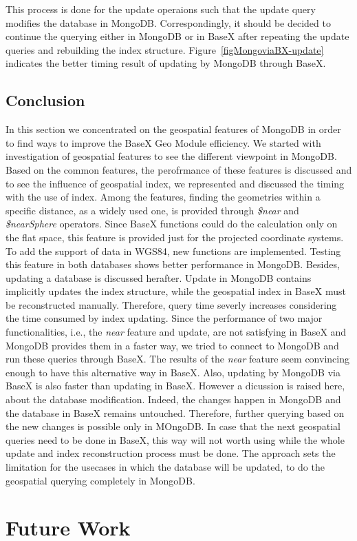 \documentclass[a4paper,12pt]{article}
\begin{document}
This process is done for the update operaions such that the update query modifies the database in MongoDB. Correspondingly, it should be decided to continue the querying either in MongoDB or in BaseX after repeating the update queries and rebuilding the index structure. Figure~\ref{figMongoviaBX-update} indicates the better timing result of updating by MongoDB through BaseX. 



\subsection{Conclusion}
\label{conc}
In this section we concentrated on the geospatial features of MongoDB in order to find ways to improve the BaseX Geo Module efficiency. We started with investigation of geospatial features to see the different viewpoint in MongoDB. Based on the common features, the perofrmance of these features is discussed and to see the influence of geospatial index, we represented and discussed the timing with the use of index. Among the features, finding the geometries within a specific distance, as a widely used one, is provided through \textit{\$near} and \textit{\$nearSphere} operators. Since BaseX functions could do the calculation only on the flat space, this feature is provided just for the projected coordinate systems. To add the support of data in WGS84, new functions are implemented. Testing this feature in both databases shows better performance in MongoDB. Besides, updating a database is discussed herafter. Update in MongoDB contains implicitly updates the index structure, while the geospatial index in BaseX must be reconstructed manually. Therefore, query time severly increases considering the time consumed by index updating. 
Since the performance of two major functionalities, i.e., the \textit{near} feature and update, are not satisfying in BaseX and MongoDB provides them in a faster way, we tried to connect to MongoDB and run these queries through BaseX. The results of the \textit{near} feature seem convincing enough to have this alternative way in BaseX. Also, updating by MongoDB via BaseX is also faster than updating in BaseX. However a  dicussion is raised here, about the database modification. Indeed, the changes happen in MongoDB and the database in BaseX remains untouched. Therefore, further querying based on the new changes is possible only in MOngoDB. In case that the next geospatial queries need to be done in BaseX, this way will not worth using while the whole update and index reconstruction process must be done. The approach sets the limitation for the usecases in which the database will be updated, to do the geospatial querying completely in MongoDB.


\newpage
\section{Future Work}
\label{s.future}
\newpage


\end{document}
